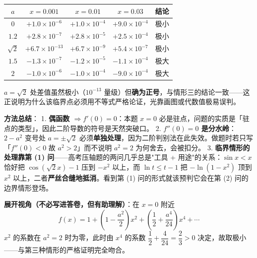\begin{center}
\begin{tabular}{ccccc}
\toprule
$a$ & $x=0.001$ & $x=0.01$ & $x=0.03$ & 结论 \\
\midrule
$0$ & $+1.0\times10^{-6}$ & $+1.0\times10^{-4}$ & $+9.0\times10^{-4}$ & 极小  \\
$1.2$ & $+2.8\times10^{-7}$ & $+2.8\times10^{-5}$ & $+2.5\times10^{-4}$ & 极小  \\
$\sqrt2$ & $+6.7\times10^{-13}$ & $+6.7\times10^{-9}$ & $+5.4\times10^{-7}$ & 极小  \\
$1.5$ & $-1.3\times10^{-7}$ & $-1.2\times10^{-5}$ & $-1.1\times10^{-4}$ & 极大  \\
$2$ & $-1.0\times10^{-6}$ & $-1.0\times10^{-4}$ & $-9.0\times10^{-4}$ & 极大  \\
\bottomrule
\end{tabular}
\end{center}

$a=\sqrt2$ 处差值虽然极小（$10^{-13}$ 量级）但\textbf{确为正号}，与情形三的结论一致——这正说明为什么该临界点必须用不等式严格论证，光靠画图或代数值极易误判。

\begin{gktip}
\textbf{方法总结}：
1. \textbf{偶函数 $\Rightarrow f'(0)=0$}：本题 $x=0$ 必是驻点，问题的实质是「驻点的类型」，因此二阶导数的符号是天然突破口。
2. \textbf{$f''(0)=0$ 是分水岭}：$2-a^{2}$ 变号处 $a=\pm\sqrt2$ 必须\textbf{单独处理}，因为二阶判别法在此失效。做题时若只写「$f''(0)<0$ 故 $a^{2}>2$」而不说明 $a^{2}=2$ 为何舍去，会被扣分。
3. \textbf{临界情形的处理靠第 (1) 问}——高考压轴题的两问几乎总是"工具 + 用途"的关系：$\sin x<x$ 恰好把 $\cos\left(\sqrt2x\right)-1$ 压到 $-x^{2}$ 以上，而 $\ln t\le t-1$ 把 $-\ln\left(1-x^{2}\right)$ 顶到 $x^{2}$ 以上，二者\textbf{严丝合缝地抵消}。看到第 (1) 问的形式就该预判它会在第 (2) 问的边界情形登场。

\textbf{展开视角（不必写进答卷，但有助理解）}：在 $x=0$ 附近
\[f(x)=1+\left(1-\frac{a^{2}}2\right)x^{2}+\left(\frac12+\frac{a^{4}}{24}\right)x^{4}+\cdots\]
$x^{2}$ 的系数在 $a^{2}=2$ 时为零，此时由 $x^{4}$ 的系数 $\dfrac12+\dfrac{4}{24}=\dfrac23>0$ 决定，故取极小——与第三种情形的严格证明完全吻合。
\end{gktip}
